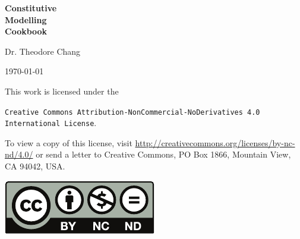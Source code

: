 \begin{titlepage}
\vspace*{\fill}
\begin{flushleft}\begin{spacing}{2}\Huge
\textbf{Constitutive\\\hspace*{2cm}Modelling\\\hspace*{4cm}Cookbook}
\end{spacing}\end{flushleft}
\vspace*{4cm}
\begin{flushright}\LARGE
Dr. Theodore Chang\end{flushright}
\vspace*{2cm}
\begin{center}
\today
\end{center}
\vspace*{\fill}
\end{titlepage}
\clearpage
\vspace*{\fill}
This work is licensed under the
\begin{center}\texttt{Creative Commons Attribution-NonCommercial-NoDerivatives 4.0 International License}.
\end{center}
To view a copy of this license, visit \url{http://creativecommons.org/licenses/by-nc-nd/4.0/} or send a letter to Creative Commons, PO Box 1866, Mountain View, CA 94042, USA.
\begin{center}
\includegraphics{PIC/MISC/by-nc-nd}
\end{center}
\clearpage